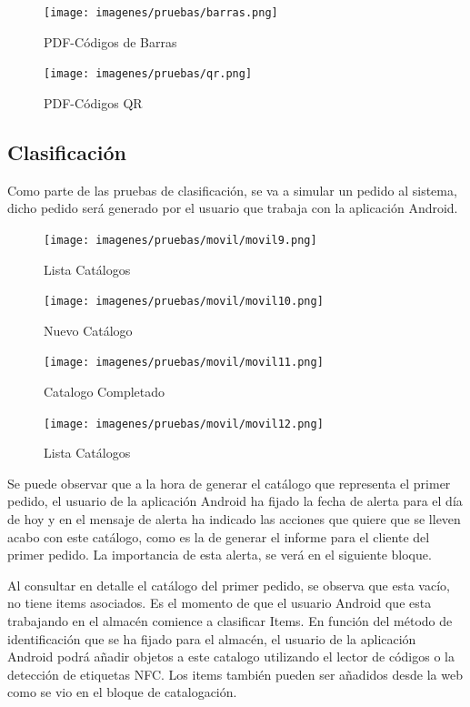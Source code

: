 \documentclass[a4paper,11pt]{book}
\begin{document}
\begin{figure}[H]
  \texttt{[image: imagenes/pruebas/barras.png]}
  \caption{PDF-Códigos de Barras\cite{propio}}
\endminipage\hfill
{}
  \texttt{[image: imagenes/pruebas/qr.png]}
  \caption{PDF-Códigos QR\cite{propio}}
\endminipage\hfill

\end{figure}


\subsection{Clasificación}

Como parte de las pruebas de clasificación, se va a simular un pedido al sistema, dicho pedido será generado por el usuario que trabaja con la aplicación Android. 

\begin{figure}[H]
  \texttt{[image: imagenes/pruebas/movil/movil9.png]}
  \caption{Lista Catálogos\cite{propio}}
\endminipage\hfill
{}
  \texttt{[image: imagenes/pruebas/movil/movil10.png]}
  \caption{Nuevo Catálogo\cite{propio}}
\endminipage\hfill
\end{figure}

\begin{figure}[H]
  \texttt{[image: imagenes/pruebas/movil/movil11.png]}
  \caption{Catalogo Completado\cite{propio}}
\endminipage\hfill
{}
  \texttt{[image: imagenes/pruebas/movil/movil12.png]}
  \caption{Lista Catálogos\cite{propio}}
\endminipage\hfill
\end{figure}

Se puede observar que a la hora de generar el catálogo que representa el primer pedido, el usuario de la aplicación Android ha fijado la fecha de alerta para el día de hoy y en el mensaje de alerta ha indicado las acciones que quiere que se lleven acabo con este catálogo, como es la de generar el informe para el cliente del primer pedido. La importancia de esta alerta, se verá en el siguiente bloque. 

Al consultar en detalle el catálogo del primer pedido, se observa que esta vacío, no tiene items asociados. Es el momento de que el usuario Android que esta trabajando en el almacén comience a clasificar Items. En función del método de identificación que se ha fijado para el almacén, el usuario de la aplicación Android podrá añadir objetos a este catalogo utilizando el lector de códigos o la detección de etiquetas NFC.  Los items también pueden ser añadidos desde la web como se vio en el bloque de catalogación.  
\end{document}
